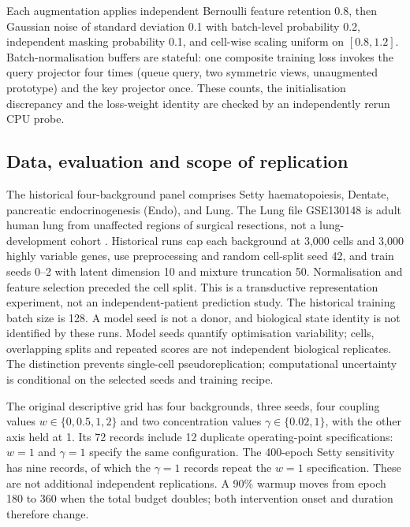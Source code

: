 \documentclass[11pt]{article}
\begin{document}
Each augmentation applies independent Bernoulli feature retention 0.8,
then Gaussian noise of standard deviation 0.1 with batch-level probability
0.2, independent masking probability 0.1, and cell-wise scaling uniform
on $[0.8,1.2]$. Batch-normalisation buffers are stateful\cite{ioffe2015batch}:
one composite training loss invokes the query projector four times
(queue query, two symmetric views, unaugmented prototype) and the key
projector once. These counts, the initialisation discrepancy and the
loss-weight identity are checked by an independently rerun CPU probe.

\subsection{Data, evaluation and scope of replication}
The historical four-background panel comprises Setty haematopoiesis,
Dentate, pancreatic endocrinogenesis (Endo)\cite{bastidas2019endocrinogenesis}, and Lung. The Lung file GSE130148 is adult human lung from
unaffected regions of surgical resections, not a lung-development cohort
\cite{vieirabraga2019lung}. Historical runs cap each background at 3,000
cells and 3,000 highly variable genes, use preprocessing and random cell-split
seed 42, and train seeds 0--2 with latent dimension 10 and mixture truncation
50. Normalisation and feature selection preceded the cell split. This is a
transductive representation experiment, not an independent-patient prediction
study. The historical training batch size is 128. A model seed is not a donor,
and biological state identity is not identified by these runs.
Model seeds quantify optimisation variability; cells, overlapping
splits and repeated scores are not independent biological replicates.
The distinction prevents single-cell pseudoreplication\cite{zimmerman2021pseudoreplication};
computational uncertainty is conditional on the selected seeds and
training recipe\cite{bouthillier2021variance}.

The original descriptive grid has four backgrounds, three seeds, four
coupling values $w\in\{0,0.5,1,2\}$ and two concentration values
$\gamma\in\{0.02,1\}$, with the other axis held at 1. Its 72 records include
12 duplicate operating-point specifications: $w=1$ and $\gamma=1$ specify the
same configuration. The 400-epoch Setty sensitivity has nine records, of
which the $\gamma=1$ records repeat the $w=1$ specification. These are not
additional independent replications. A 90\% warmup moves from epoch 180 to
360 when the total budget doubles; both intervention onset and duration
therefore change.
\end{document}
